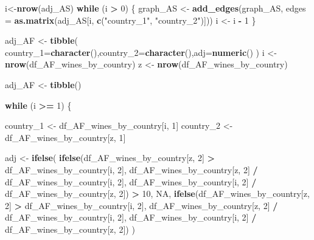 \documentclass[
]{article}
\newenvironment{Shaded}{\begin{snugshade}}{\end{snugshade}}
\newcommand{\AttributeTok}[1]{\textcolor[rgb]{0.13,0.29,0.53}{#1}}
\newcommand{\ConstantTok}[1]{\textcolor[rgb]{0.56,0.35,0.01}{#1}}
\newcommand{\ControlFlowTok}[1]{\textcolor[rgb]{0.13,0.29,0.53}{\textbf{#1}}}
\newcommand{\DecValTok}[1]{\textcolor[rgb]{0.00,0.00,0.81}{#1}}
\newcommand{\FunctionTok}[1]{\textcolor[rgb]{0.13,0.29,0.53}{\textbf{#1}}}
\newcommand{\NormalTok}[1]{#1}
\newcommand{\OtherTok}[1]{\textcolor[rgb]{0.56,0.35,0.01}{#1}}
\newcommand{\SpecialCharTok}[1]{\textcolor[rgb]{0.81,0.36,0.00}{\textbf{#1}}}
\newcommand{\StringTok}[1]{\textcolor[rgb]{0.31,0.60,0.02}{#1}}
\begin{document}
\begin{Shaded}
\begin{Highlighting}[]
\NormalTok{i}\OtherTok{\textless{}{-}}\FunctionTok{nrow}\NormalTok{(adj\_AS)}
\ControlFlowTok{while}\NormalTok{ (i }\SpecialCharTok{\textgreater{}} \DecValTok{0}\NormalTok{) \{}
\NormalTok{  graph\_AS }\OtherTok{\textless{}{-}} \FunctionTok{add\_edges}\NormalTok{(graph\_AS, }\AttributeTok{edges =} \FunctionTok{as.matrix}\NormalTok{(adj\_AS[i, }\FunctionTok{c}\NormalTok{(}\StringTok{"country\_1"}\NormalTok{, }\StringTok{"country\_2"}\NormalTok{)]))}
\NormalTok{  i }\OtherTok{\textless{}{-}}\NormalTok{ i }\SpecialCharTok{{-}} \DecValTok{1}
\NormalTok{\}}
\end{Highlighting}
\end{Shaded}

\begin{Shaded}
\begin{Highlighting}[]
\NormalTok{adj\_AF }\OtherTok{\textless{}{-}} \FunctionTok{tibble}\NormalTok{( }\AttributeTok{country\_1=}\FunctionTok{character}\NormalTok{(),}\AttributeTok{country\_2=}\FunctionTok{character}\NormalTok{(),}\AttributeTok{adj=}\FunctionTok{numeric}\NormalTok{()}
\NormalTok{)}
\NormalTok{i }\OtherTok{\textless{}{-}} \FunctionTok{nrow}\NormalTok{(df\_AF\_wines\_by\_country)}
\NormalTok{z }\OtherTok{\textless{}{-}} \FunctionTok{nrow}\NormalTok{(df\_AF\_wines\_by\_country)}

\NormalTok{adj\_AF }\OtherTok{\textless{}{-}} \FunctionTok{tibble}\NormalTok{()  }

\ControlFlowTok{while}\NormalTok{ (i }\SpecialCharTok{\textgreater{}=} \DecValTok{1}\NormalTok{) \{  }

\NormalTok{  country\_1 }\OtherTok{\textless{}{-}}\NormalTok{ df\_AF\_wines\_by\_country[i, }\DecValTok{1}\NormalTok{]}
\NormalTok{  country\_2 }\OtherTok{\textless{}{-}}\NormalTok{ df\_AF\_wines\_by\_country[z, }\DecValTok{1}\NormalTok{]}

\NormalTok{  adj }\OtherTok{\textless{}{-}} \FunctionTok{ifelse}\NormalTok{(}
    \FunctionTok{ifelse}\NormalTok{(df\_AF\_wines\_by\_country[z, }\DecValTok{2}\NormalTok{] }\SpecialCharTok{\textgreater{}}\NormalTok{ df\_AF\_wines\_by\_country[i, }\DecValTok{2}\NormalTok{],}
\NormalTok{           df\_AF\_wines\_by\_country[z, }\DecValTok{2}\NormalTok{] }\SpecialCharTok{/}\NormalTok{ df\_AF\_wines\_by\_country[i, }\DecValTok{2}\NormalTok{],}
\NormalTok{           df\_AF\_wines\_by\_country[i, }\DecValTok{2}\NormalTok{] }\SpecialCharTok{/}\NormalTok{ df\_AF\_wines\_by\_country[z, }\DecValTok{2}\NormalTok{]) }\SpecialCharTok{\textgreater{}} \DecValTok{10}\NormalTok{,}
    \ConstantTok{NA}\NormalTok{,}
    \FunctionTok{ifelse}\NormalTok{(df\_AF\_wines\_by\_country[z, }\DecValTok{2}\NormalTok{] }\SpecialCharTok{\textgreater{}}\NormalTok{ df\_AF\_wines\_by\_country[i, }\DecValTok{2}\NormalTok{],}
\NormalTok{           df\_AF\_wines\_by\_country[z, }\DecValTok{2}\NormalTok{] }\SpecialCharTok{/}\NormalTok{ df\_AF\_wines\_by\_country[i, }\DecValTok{2}\NormalTok{],}
\NormalTok{           df\_AF\_wines\_by\_country[i, }\DecValTok{2}\NormalTok{] }\SpecialCharTok{/}\NormalTok{ df\_AF\_wines\_by\_country[z, }\DecValTok{2}\NormalTok{])}
\NormalTok{  )}


\end{Highlighting}
\end{Shaded}
\end{document}
